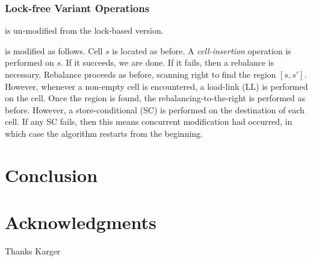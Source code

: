 \documentclass{style}
\begin{document}
\subsubsection{Lock-free Variant Operations}

\Search{} is un-modified from the lock-based version.

\Insert{} is modified as follows. Cell $s$ is located as before. A
\textit{cell-insertion} operation is performed on $s$. If it succeeds, we are
done. If it fails, then a rebalance is necessary. Rebalance proceeds as before,
scanning right to find the region $[s, s']$. However, whenever a non-empty cell
is encountered, a load-link (LL) is performed on the cell.  Once the region is
found, the rebalancing-to-the-right is performed as before.  However, a
store-conditional (SC) is performed on the destination of each cell.  If any SC
fails, then this means concurrent modification had occurred, in which case the
algorithm restarts from the beginning.

\section{Conclusion}


\section{Acknowledgments}
Thanks Karger
\end{document}
